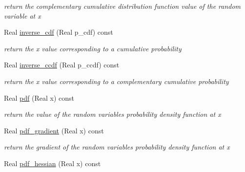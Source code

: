 \begin{DoxyCompactItemize}
\begin{DoxyCompactList}\small\item\em return the complementary cumulative distribution function value of the random variable at x \end{DoxyCompactList}\item 
Real \hyperlink{classPecos_1_1HistogramBinRandomVariable_a918a1aac05ca349ea5313eebcba46c3e}{inverse\+\_\+cdf} (Real p\+\_\+cdf) const \label{classPecos_1_1HistogramBinRandomVariable_a918a1aac05ca349ea5313eebcba46c3e}

\begin{DoxyCompactList}\small\item\em return the x value corresponding to a cumulative probability \end{DoxyCompactList}\item 
Real \hyperlink{classPecos_1_1HistogramBinRandomVariable_afda003a1f59ff6930902cd5c8601f49b}{inverse\+\_\+ccdf} (Real p\+\_\+ccdf) const \label{classPecos_1_1HistogramBinRandomVariable_afda003a1f59ff6930902cd5c8601f49b}

\begin{DoxyCompactList}\small\item\em return the x value corresponding to a complementary cumulative probability \end{DoxyCompactList}\item 
Real \hyperlink{classPecos_1_1HistogramBinRandomVariable_a8ec69265f428e17c1707133cb137a819}{pdf} (Real x) const \label{classPecos_1_1HistogramBinRandomVariable_a8ec69265f428e17c1707133cb137a819}

\begin{DoxyCompactList}\small\item\em return the value of the random variable\textquotesingle{}s probability density function at x \end{DoxyCompactList}\item 
Real \hyperlink{classPecos_1_1HistogramBinRandomVariable_aaa7ca3718abc034be7629af5594efca0}{pdf\+\_\+gradient} (Real x) const \label{classPecos_1_1HistogramBinRandomVariable_aaa7ca3718abc034be7629af5594efca0}

\begin{DoxyCompactList}\small\item\em return the gradient of the random variable\textquotesingle{}s probability density function at x \end{DoxyCompactList}\item 
Real \hyperlink{classPecos_1_1HistogramBinRandomVariable_a514a0abe97269ac6e003f43683d9137e}{pdf\+\_\+hessian} (Real x) const \label{classPecos_1_1HistogramBinRandomVariable_a514a0abe97269ac6e003f43683d9137e}


\end{DoxyCompactItemize}
